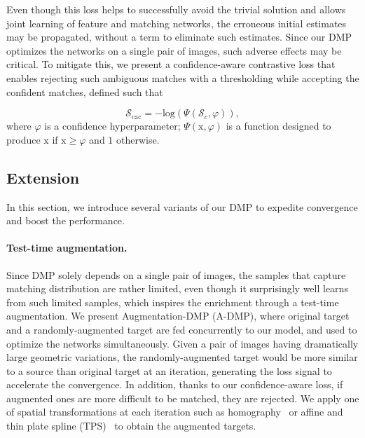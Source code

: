 \documentclass[10pt,twocolumn,letterpaper]{article}
\begin{document}
Even though this loss helps to successfully avoid the trivial solution and allows joint learning of feature and matching networks, the erroneous initial estimates may be propagated, without a term to eliminate such estimates. Since our DMP optimizes the networks on a single pair of images, such adverse effects may be critical. To mitigate this, we present a confidence-aware contrastive loss that enables rejecting such ambiguous matches with a thresholding while accepting the confident matches, defined such that


\begin{equation}\label{eq7}
\mathcal{S}_\mathrm{cac}=-\mathrm{log}\left( \Psi \left(\mathcal{S}_c, \varphi \right) \right),
\end{equation}
where $\varphi$ is a confidence hyperparameter; $\Psi(\mathrm{x},\varphi)$ is a function designed to produce $\mathrm{x}$ if $\mathrm{x}\geq\varphi$ and $1$ otherwise.

\subsection{Extension}\label{sec:3_4}
In this section, we introduce several variants of our DMP to expedite convergence and boost the performance.
\vspace{-10pt}

\paragraph{Test-time augmentation.}
Since DMP solely depends on a single pair of images, the samples that capture matching distribution are rather limited, even though it surprisingly well learns from such limited samples, which inspires the enrichment through a test-time augmentation. 
We present Augmentation-DMP (A-DMP), where original target and a randomly-augmented target are fed concurrently to our model, and used to optimize the networks simultaneously. Given a pair of images having dramatically large geometric variations, the randomly-augmented target would be more similar to a source than original target at an iteration, generating the loss signal to accelerate the convergence. In addition, thanks to our confidence-aware loss, if augmented ones are more difficult to be matched, they are rejected. We apply one of spatial transformations at each iteration such as homography~\cite{detone2016deep} or affine and thin plate spline (TPS)~\cite{rocco2017convolutional} to obtain the augmented targets. 
\vspace{-10pt}
\end{document}

